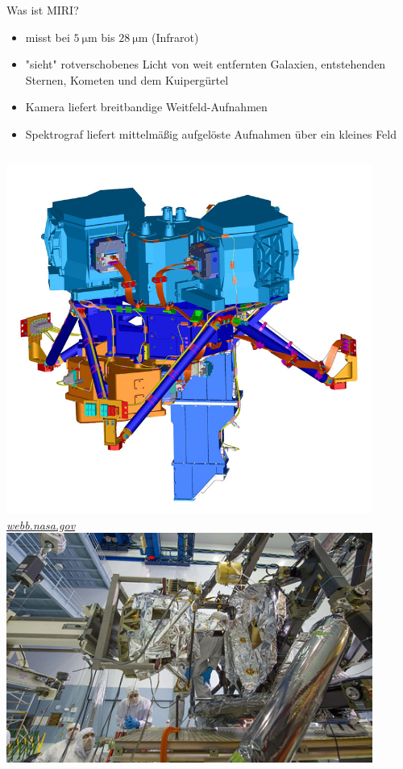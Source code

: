 \documentclass[aspectratio=1610, 9pt, xcolor=dvipsnames]{beamer}
\begin{document}
\begin{frame}{Was ist MIRI?}
  \begin{itemize}
    \item misst bei $\qty{5}{\micro\metre}$ bis $\qty{28}{\micro\metre}$ (Infrarot)
    \item "sieht" rotverschobenes Licht von weit entfernten Galaxien, entstehenden Sternen, Kometen und dem Kuipergürtel
    \item Kamera liefert breitbandige Weitfeld-Aufnahmen
    \item Spektrograf liefert mittelmäßig aufgelöste Aufnahmen über ein kleines Feld
  \end{itemize}
  \begin{columns}
    \centering
    \includegraphics[width = 0.9\textwidth]{Plots/miri_cad.jpg}
  \hspace*{12pt}\hbox{\scriptsize {\footnotesize\itshape \href{https://webb.nasa.gov/content/observatory/instruments/miri.html}
  {webb.nasa.gov}}}
    \centering
    \includegraphics[width = 0.9\textwidth]{Plots/miri_installation.jpg}

\end{columns}
\end{frame}
\end{document}
